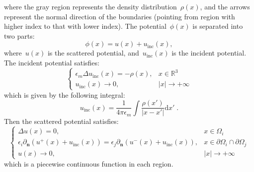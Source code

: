 \documentclass[prb,preprintnumbers,amsmath,amssymb, 10pt]{revtex4}
\newcommand{\abs}[1]{\left|#1\right|} %
\begin{document}
\noindent where the gray region represents the density distribution~$\rho(x)$, and the arrows represent the normal direction of the boundaries (pointing from region with higher index to that with lower index).
The potential~$\phi(x)$ is separated into two parts:
\begin{equation}
    \phi(x) = u(x) + u_{\text{inc}}(x),
\end{equation}
where~$u(x)$ is the scattered potential, and~$u_{\text{inc}}(x)$ is the incident potential.
The incident potential satisfies:
\begin{equation}
    \begin{cases}
    \epsilon_m \Delta u_{\text{inc}}(x) = - \rho(x), & x \in \mathbb{R}^3 \\
    u_{\text{inc}}(x) \to 0, & \abs{x} \to + \infty 
    \end{cases}
\end{equation}
which is given by the following integral:
\begin{equation}
    u_{\text{inc}}(x) = \frac{1}{4 \pi \epsilon_m} \int \frac{\rho(x')}{|x - x'|} \mathrm{d}x'\;.
\end{equation}
Then the scattered potential satisfies:
\begin{equation}\label{eq:scattered-potential-boundary}
    \begin{cases}
    \Delta u(x) = 0, & x \in \Omega_i \\
    \epsilon_i \partial_{\mathbf{n}} \left( u^+(x) + u_{\text{inc}}(x) \right) = \epsilon_j \partial_{\mathbf{n}} \left( u^-(x) + u_{\text{inc}}(x) \right), & x \in \partial \Omega_i \cap \partial \Omega_j \\
    u(x) \to 0, & \abs{x} \to + \infty 
    \end{cases}
\end{equation}
which is a piecewise continuous function in each region.
\end{document}
